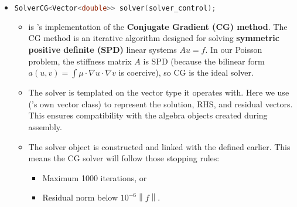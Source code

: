 \begin{itemize}
    \item {}
    \begin{lstlisting}[language=C++]
SolverCG<Vector<double>> solver(solver_control);\end{lstlisting}
    \begin{itemize}
        \item {} is 's implementation of the \textbf{Conjugate Gradient (CG) method}. The CG method is an iterative algorithm designed for solving \textbf{symmetric positive definite (SPD)} linear systems $Au=f$. In our Poisson problem, the stiffness matrix $A$ is SPD (because the bilinear form $a(u,v) = \int \mu \cdot \nabla u \cdot \nabla v$ is coercive), so CG is the ideal solver.
        
        \item The solver is templated on the vector type it operates with. Here we use  ('s own vector class) to represent the solution, RHS, and residual vectors. This ensures compatibility with the algebra objects created during assembly.
        
        \item The solver object is constructed and linked with the  defined earlier. This means the CG solver will follow those stopping rules:
        \begin{itemize}
            \item Maximum 1000 iterations, or
            \item Residual norm below $10^{-6} \left\| f \right\|$.
        \end{itemize}
    \end{itemize}



\end{itemize}
